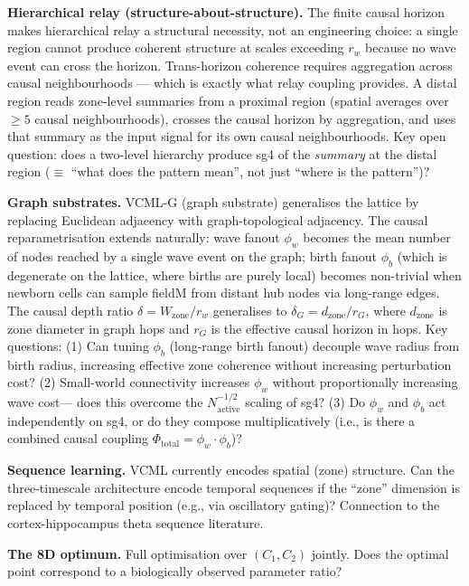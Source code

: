 \documentclass[11pt]{article}
\begin{document}
\textbf{Hierarchical relay (structure-about-structure).}
The finite causal horizon makes hierarchical relay a structural necessity, not an engineering
choice: a single region cannot produce coherent structure at scales exceeding $r_w$ because
no wave event can cross the horizon.
Trans-horizon coherence requires aggregation across causal neighbourhoods ---
which is exactly what relay coupling provides.
A distal region reads zone-level summaries from a proximal region (spatial averages
over $\geq 5$ causal neighbourhoods), crosses the causal horizon by aggregation,
and uses that summary as the input signal for its own causal neighbourhoods.
Key open question: does a two-level hierarchy produce sg4 of the \emph{summary}
at the distal region ($\equiv$ ``what does the pattern mean'', not just
``where is the pattern'')?

\textbf{Graph substrates.}
VCML-G (graph substrate) generalises the lattice by replacing Euclidean adjacency with
graph-topological adjacency.
The causal reparametrisation extends naturally: wave fanout $\phi_w$ becomes the mean
number of nodes reached by a single wave event on the graph; birth fanout $\phi_b$
(which is degenerate on the lattice, where births are purely local) becomes non-trivial
when newborn cells can sample fieldM from distant hub nodes via long-range edges.
The causal depth ratio $\delta = W_\mathrm{zone}/r_w$ generalises to
$\delta_G = d_\mathrm{zone}/r_G$, where $d_\mathrm{zone}$ is zone diameter in graph hops
and $r_G$ is the effective causal horizon in hops.
Key questions:
(1) Can tuning $\phi_b$ (long-range birth fanout) decouple wave radius from birth radius,
increasing effective zone coherence without increasing perturbation cost?
(2) Small-world connectivity increases $\phi_w$ without proportionally increasing wave cost---
does this overcome the $N_\mathrm{active}^{-1/2}$ scaling of sg4?
(3) Do $\phi_w$ and $\phi_b$ act independently on sg4, or do they compose multiplicatively
(i.e., is there a combined causal coupling $\Phi_\mathrm{total} = \phi_w \cdot \phi_b$)?

\textbf{Sequence learning.}
VCML currently encodes spatial (zone) structure.
Can the three-timescale architecture encode temporal sequences if the ``zone'' dimension is
replaced by temporal position (e.g., via oscillatory gating)?
Connection to the cortex-hippocampus theta sequence literature.

\textbf{The 8D optimum.}
Full optimisation over $(C_1, C_2)$ jointly.
Does the optimal point correspond to a biologically observed parameter ratio?
\end{document}

